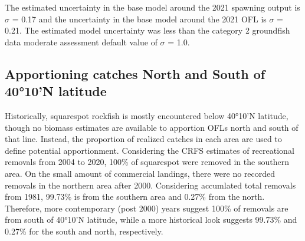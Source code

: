 \documentclass[11pt,
  english,
  a4paper,
]{article}
\begin{document}
\leavevmode\tagmcend\tagstructend


The estimated uncertainty in the base model around the 2021 spawning output is {\(\sigma\)\leavevmode\tagmcend\tagstructend} = 0.17 and the uncertainty in the base model around the 2021 OFL is {\(\sigma\)\leavevmode\tagmcend\tagstructend} = 0.21. The estimated model uncertainty was less than the category 2 groundfish data moderate assessment default value of {\(\sigma\)\leavevmode\tagmcend\tagstructend} = 1.0.

\leavevmode\tagmcend\tagstructend\par


\hypertarget{apportioning-catches-north-and-south-of-4010n-latitude}{%
\subsection{Apportioning catches North and South of 40°10'N latitude}\label{apportioning-catches-north-and-south-of-4010n-latitude}}

\leavevmode\tagmcend\tagstructend


Historically, squarespot rockfish is mostly encountered below 40°10'N latitude, though no biomass estimates are available to apportion OFLs north and south of that line. Instead, the proportion of realized catches in each area are used to define potential apportionment. Considering the CRFS estimates of recreational removals from 2004 to 2020, 100\% of squarespot were removed in the southern area. On the small amount of commercial landings, there were no recorded removals in the northern area after 2000. Considering accumlated total removals from 1981, 99.73\% is from the southern area and 0.27\% from the north. Therefore, more contemporary (post 2000) years suggest 100\% of removals are from south of 40°10'N latitude, while a more historical look suggests 99.73\% and 0.27\% for the south and north, respectively.

\leavevmode\tagmcend\tagstructend\par

\end{document}
